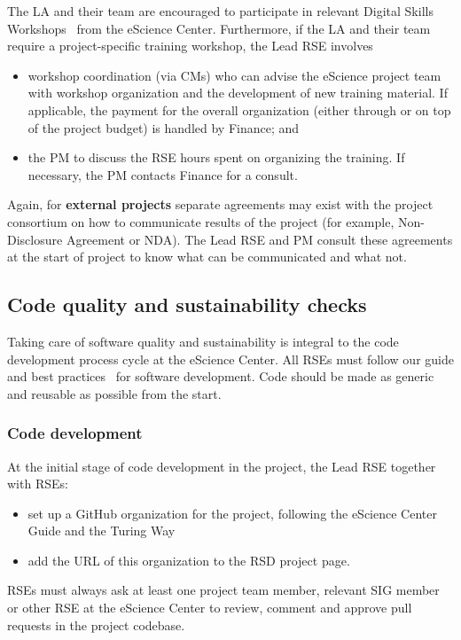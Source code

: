 The LA and their team are encouraged to participate in relevant Digital Skills Workshops~\cite{digital-skills} from the eScience Center. Furthermore, if the LA and their team
require a project-specific training workshop, the Lead RSE involves
\begin{itemize}
\item workshop coordination (via CMs) who can advise the eScience project team with workshop organization and the development
of new training material. If applicable, the payment for the overall organization (either through or on top of the
project budget) is handled by Finance; and
\item the PM to discuss the RSE hours spent on organizing the training. If necessary, the PM contacts Finance for a consult.
\end{itemize}

Again, for \textbf{external projects} separate agreements may exist with the project consortium on how to communicate
results of the project (for example, Non-Disclosure Agreement or NDA). The Lead RSE and PM consult these agreements at
the start of project to know what can be communicated and what not.

\subsection{Code quality and sustainability checks}
Taking care of software quality and sustainability is integral to the code development process cycle at the eScience
Center. All RSEs must follow our guide and best practices~\cite{guide-nlesc} for software development. Code should be made
as generic and reusable as possible from the start.

\subsubsection{Code development}
\label{sec:exec:code}
At the initial stage of code development in the project, the Lead RSE together with RSEs:

\begin{itemize}
\item set up a GitHub organization for the project, following the eScience Center Guide and the Turing Way~\cite{the_turing_way-2023}
\item add the URL of this organization to the RSD project page.
\end{itemize}

RSEs must always ask at least one project team member, relevant SIG member or other RSE at the eScience Center to
review, comment and approve pull requests in the project codebase.

